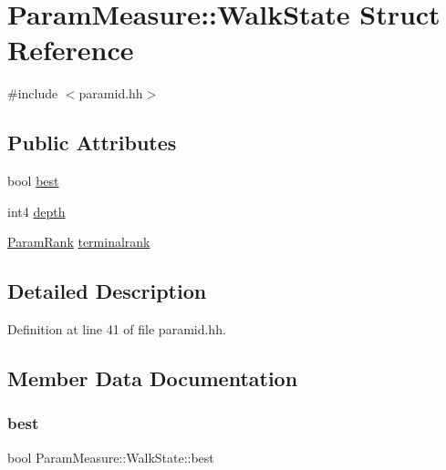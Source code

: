 \hypertarget{struct_param_measure_1_1_walk_state}{}\section{Param\+Measure\+::Walk\+State Struct Reference}
\label{struct_param_measure_1_1_walk_state}


{\ttfamily \#include $<$paramid.\+hh$>$}

\subsection*{Public Attributes}
\begin{DoxyCompactItemize}
\item 
bool \mbox{\hyperlink{struct_param_measure_1_1_walk_state_a6ef95b0d025135c060993e6d834b0093}{best}}
\item 
int4 \mbox{\hyperlink{struct_param_measure_1_1_walk_state_a23ddda18c4239c2fb2b0d5d7391b72df}{depth}}
\item 
\mbox{\hyperlink{class_param_measure_a8393fe6e19e1e4e80943a9b3e3f717c6}{Param\+Rank}} \mbox{\hyperlink{struct_param_measure_1_1_walk_state_ade3ba76348c31180fbf15b61e2a3ccc4}{terminalrank}}
\end{DoxyCompactItemize}


\subsection{Detailed Description}


Definition at line 41 of file paramid.\+hh.



\subsection{Member Data Documentation}
\mbox{\label{struct_param_measure_1_1_walk_state_a6ef95b0d025135c060993e6d834b0093}} 
\subsubsection{\texorpdfstring{best}{best}}
{\footnotesize\ttfamily bool Param\+Measure\+::\+Walk\+State\+::best}



